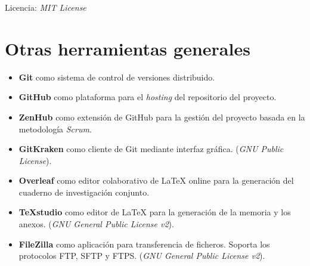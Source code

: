 Licencia: \textit{MIT License}

\section{Otras herramientas generales}

\begin{itemize}
	\item \textbf{Git} como sistema de control de versiones distribuido. 
	\item \textbf{GitHub} como plataforma para el \textit{hosting} del repositorio del proyecto. 
	\item \textbf{ZenHub} como extensión de GitHub para la gestión del proyecto basada en la metodología \textit{Scrum}. 
	\item \textbf{GitKraken} como cliente de Git mediante interfaz gráfica. (\textit{GNU Public License}).
	\item \textbf{Overleaf} como editor colaborativo de \LaTeX{} online para la generación del cuaderno de investigación conjunto. 
	\item \textbf{\TeX studio} como editor de \LaTeX{} para la generación de la memoria y los anexos. (\textit{GNU General Public License v2}).
	\item \textbf{FileZilla} como aplicación para transferencia de ficheros. Soporta los protocolos FTP, SFTP y FTPS. (\textit{GNU General Public License v2}).
\end{itemize}




















